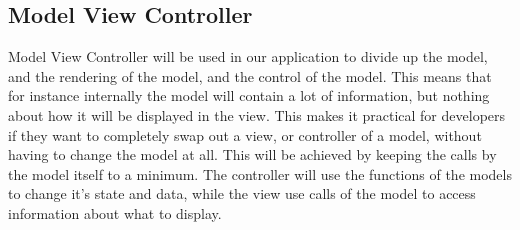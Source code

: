 \subsection{Model View Controller}
Model View Controller \cite{wiki:mvc} will be used in our application to divide up the model, and the rendering of the model, and the control of the model. This means that for instance internally the model will contain a lot of information, but nothing about how it will be displayed in the view. This makes it practical for developers if they want to completely swap out a view, or controller of a model, without having to change the model at all. This will be achieved by keeping the calls by the model itself to a minimum. The controller will use the functions of the models to change it's state and data, while the view use calls of the model to access information about what to display.